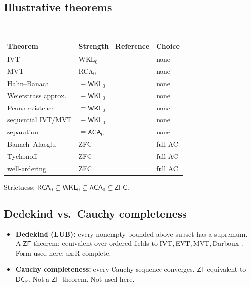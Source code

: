 \documentclass[11pt,reqno]{amsart}
\providecommand{\R}{\mathbb{R}}
\theoremstyle{redplain}
\begin{document}
\subsection{Illustrative theorems}

\bigskip

\begin{center}
{\small \ 
\begin{tabular}{|>{\raggedright\arraybackslash}m{4.5cm}|>{\centering\arraybackslash}m{2.5cm}|>{\centering\arraybackslash}m{3.2cm}|>{\centering\arraybackslash}m{1.3cm}|}
\hline
\textbf{Theorem} & \textbf{Strength} & \textbf{Reference} & \textbf{Choice}
\\ \hline
\textsf{IVT} & \textsf{WKL$_0$} & \cite{Simpson2009} & \textsf{none} \\ 
\hline
\textsf{MVT} & \textsf{RCA$_0$} & \cite{HardinVelleman2001} & \textsf{none}
\\ \hline
\textsf{Hahn--Banach} & $\equiv\mathsf{WKL}_0$ & \cite{Simpson2009} & 
\textsf{none} \\ \hline
\textsf{Weierstrass approx.} & $\equiv\mathsf{WKL}_0$ & \cite{Simpson2009} & 
\textsf{none} \\ \hline
\textsf{Peano existence} & $\equiv\mathsf{WKL}_0$ & \cite{Simpson2009} & 
\textsf{none} \\ \hline
\textsf{sequential IVT/MVT} & $\equiv\mathsf{WKL}_0$ & \cite{Sanders2020} & 
\textsf{none} \\ \hline
\textsf{separation} & $\equiv\mathsf{ACA}_0$ & \cite{Humphreys2015} & 
\textsf{none} \\ \hline
\textsf{Banach--Alaoglu} & \textsf{ZFC} & \cite{Alaoglu1940} & \textsf{full
AC} \\ \hline
\textsf{Tychonoff} & \textsf{ZFC} & \cite{Kelley1950} & \textsf{full AC} \\ 
\hline
\textsf{well-ordering} & \textsf{ZFC} & \cite{Jech1973} & \textsf{full AC}
\\ \hline
\end{tabular}
}
\end{center}

\medskip \noindent Strictness: $\mathsf{RCA}_0\subsetneq\mathsf{WKL}%
_0\subsetneq\mathsf{ACA}_0\subsetneq\mathsf{ZFC}$.

\subsection{Dedekind vs.\ Cauchy completeness}

\begin{itemize}
\item \textbf{Dedekind (LUB):} every nonempty bounded-above subset has a
supremum. A $\mathsf{ZF}$ theorem; equivalent over ordered fields to
IVT,\,\allowbreak EVT,\,\allowbreak MVT,\,\allowbreak Darboux \cite%
{Propp2012,Teismann2013}. Form used here: \textsf{ax:R-complete}.

\item \textbf{Cauchy completeness:} every Cauchy sequence converges. $%
\mathsf{ZF}$-equivalent to $\mathsf{DC}_\R$. Not a $\mathsf{ZF}$ theorem.
Not used here.
\end{itemize}
\end{document}
